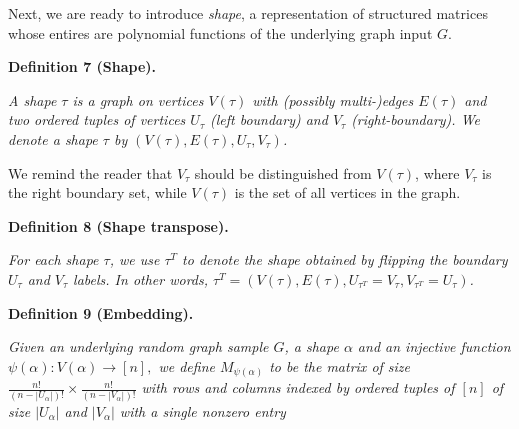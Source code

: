\documentclass[10pt,a4paper]{article}
\begin{document}
Next, we are ready to introduce \emph{shape}, a representation of structured matrices whose entires are polynomial functions of the underlying graph input $G$.\par





\par\medskip\noindent\textbf{
\textbf{Definition 7}\textbf{ }(Shape)\textbf{.}
}\par



\emph{A shape $\tau$ is a graph on vertices $V(\tau)$ with (possibly multi-)edges $E(\tau)$ and two ordered tuples of vertices $U_{\tau}$ (left boundary) and $V_{\tau}$ (right-boundary). We denote a shape $\tau$ by $(V(\tau),E(\tau),U_{\tau},V_{\tau})$.}\par






We remind the reader that $V_{\tau}$ should be distinguished from $V(\tau)$, where $V_{\tau}$ is the right boundary set, while $V(\tau)$ is the set of all vertices in the graph.\par





\par\medskip\noindent\textbf{
\textbf{Definition 8}\textbf{ }(Shape transpose)\textbf{.}
}\par



\emph{For each shape $\tau$, we use $\tau^{T}$ to denote the shape obtained by flipping the boundary $U_{\tau}$ and $V_{\tau}$ labels. In other words, $\tau^{T}=(V(\tau),E(\tau),U_{\tau^{T}}=V_{\tau},V_{\tau^{T}}=U_{\tau})$.}\par







\par\medskip\noindent\textbf{
\textbf{Definition 9}\textbf{ }(Embedding)\textbf{.}
}\par



\emph{Given an underlying random graph sample $G$, a shape $\alpha$ and an injective function $\psi(\alpha):V(\alpha)\to[n],$ we define $M_{\psi(\alpha)}$ to be the matrix of size
$\frac{n!}{(n-|U_{\alpha}|)!}\times\frac{n!}{(n-|V_{\alpha}|)!}$
with rows and columns indexed by ordered tuples of $[n]$ of size $|U_{\alpha}|$ and $|V_{\alpha}|$ with a single nonzero entry}\par
\end{document}
